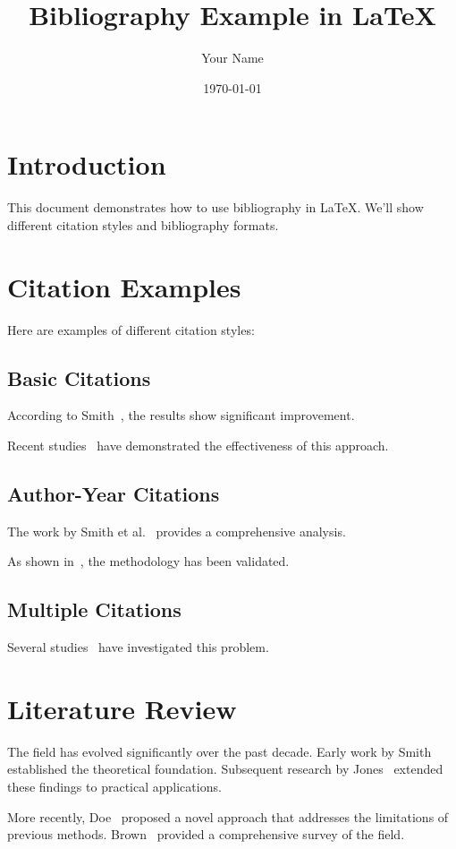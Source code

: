 \documentclass{article}
\title{Bibliography Example in LaTeX}
\author{Your Name}
\date{\today}
\begin{document}
\maketitle

\section{Introduction}
This document demonstrates how to use bibliography in LaTeX. We'll show different citation styles and bibliography formats.

\section{Citation Examples}
Here are examples of different citation styles:

\subsection{Basic Citations}
According to Smith~\cite{smith2023}, the results show significant improvement.

Recent studies~\cite{jones2022,doe2023} have demonstrated the effectiveness of this approach.

\subsection{Author-Year Citations}
The work by Smith et al.~\cite{smith2023} provides a comprehensive analysis.

As shown in~\cite{jones2022}, the methodology has been validated.

\subsection{Multiple Citations}
Several studies~\cite{smith2023,jones2022,doe2023,brown2021} have investigated this problem.

\section{Literature Review}
The field has evolved significantly over the past decade. Early work by Smith~\cite{smith2023} established the theoretical foundation. Subsequent research by Jones~\cite{jones2022} extended these findings to practical applications.

More recently, Doe~\cite{doe2023} proposed a novel approach that addresses the limitations of previous methods. Brown~\cite{brown2021} provided a comprehensive survey of the field.
\end{document}
